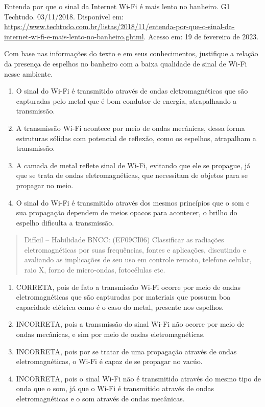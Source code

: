 Entenda por que o sinal da Internet Wi-Fi é mais lento no banheiro. G1
Techtudo. 03/11/2018. Disponível em:
\url{https://www.techtudo.com.br/listas/2018/11/entenda-por-que-o-sinal-da-internet-wi-fi-e-mais-lento-no-banheiro.ghtml}.
Acesso em: 19 de fevereiro de 2023.

Com base nas informações do texto e em seus conhecimentos, justifique a
relação da presença de espelhos no banheiro com a baixa qualidade de
sinal de Wi-Fi nesse ambiente.

\begin{enumerate}
\def\labelenumi{(\Alph{enumi})}
\item
  O sinal do Wi-Fi é transmitido através de ondas eletromagnéticas que
  são capturadas pelo metal que é bom condutor de energia, atrapalhando
  a transmissão.
\item
  A transmissão Wi-Fi acontece por meio de ondas mecânicas, dessa forma
  estruturas sólidas com potencial de reflexão, como os espelhos,
  atrapalham a transmissão.
\item
  A camada de metal reflete sinal de Wi-Fi, evitando que ele se
  propague, já que se trata de ondas eletromagnéticas, que necessitam de
  objetos para se propagar no meio.
\item
  O sinal do Wi-Fi é transmitido através dos mesmos princípios que o som
  e sua propagação dependem de meios opacos para acontecer, o brilho do
  espelho dificulta a transmissão.
\end{enumerate}

\begin{quote}
Difícil -- Habilidade BNCC: (EF09CI06) Classificar as radiações
eletromagnéticas por suas frequências, fontes e aplicações, discutindo e
avaliando as implicações de seu uso em controle remoto, telefone
celular, raio X, forno de micro-ondas, fotocélulas etc.
\end{quote}

\begin{enumerate}
\def\labelenumi{(\Alph{enumi})}
\item
  CORRETA, pois de fato a transmissão Wi-Fi ocorre por meio de ondas
  eletromagnéticas que são capturadas por materiais que possuem boa
  capacidade elétrica como é o caso do metal, presente nos espelhos.
\item
  INCORRETA, pois a transmissão do sinal Wi-Fi não ocorre por meio de
  ondas mecânicas, e sim por meio de ondas eletromagnéticas.
\item
  INCORRETA, pois por se tratar de uma propagação através de ondas
  eletromagnéticas, o Wi-Fi é capaz de se propagar no vacúo.
\item
  INCORRETA, pois o sinal Wi-Fi não é transmitido através do mesmo tipo
  de onda que o som, já que o Wi-Fi é transmitido através de ondas
  eletromagnéticas e o som através de ondas mecânicas.
\end{enumerate}

